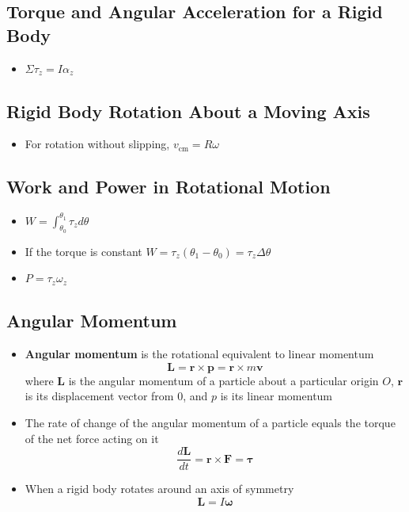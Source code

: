 \documentclass{article}
\begin{document}
\subsection{Torque and Angular Acceleration for a Rigid Body}

\begin{itemize}
  \item $\Sigma\tau_z = I\alpha_z$
\end{itemize}

\subsection{Rigid Body Rotation About a Moving Axis}

\begin{itemize}
  \item For rotation without slipping, $v_\textrm{cm}=R\omega$
\end{itemize}

\subsection{Work and Power in Rotational Motion}

\begin{itemize}
  \item $W=\int_{\theta_0}^{\theta_1}\tau_z d\theta$

  \item If the torque is constant $W=\tau_z(\theta_1-\theta_0)=\tau_z\Delta\theta$

  \item $P=\tau_z\omega_z$
\end{itemize}

\subsection{Angular Momentum}

\begin{itemize}
  \item \textbf{Angular momentum} is the rotational equivalent to linear momentum \[\mathbf L = \mathbf r \times \mathbf p = \mathbf r \times m \mathbf v\] where $\mathbf L$ is the angular momentum of a particle about a particular origin $O$, $\mathbf r$ is its displacement vector from $0$, and $p$ is its linear momentum

  \item The rate of change of the angular momentum of a particle equals the torque of the net force acting on it \[\frac{d\mathbf L}{dt}=\mathbf r \times \mathbf F = \boldsymbol \tau\]

  \item When a rigid body rotates around an axis of symmetry \[\mathbf L = I \boldsymbol \omega\]
\end{itemize}
\end{document}
